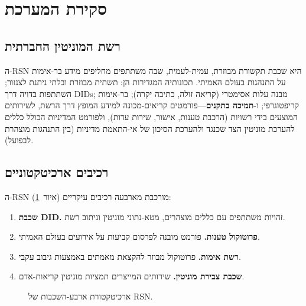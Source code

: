 \documentclass[11pt,a4paper,twocolumn]{article}
\begin{document}
\section{סקירת המערכת}

\subsection{רשת המוניטין החברתית}

ה-RSN היא שכבת תקשורת מבוזרת, עמית-לעמית, שבה משתתפים מחליפים מידע בר-אימות על התנהגות בעולם האמיתי. תכונותיה המגדירות הן: תשתית מבוזרת ובלתי ניתנת לצנזור; השתתפות בדויה דרך DIDs; מבנה עלות אסימטרי (קריאה זולה, כתיבה יקרה); בר-אימות קריפטוגרפי; ו-\textbf{תמיכה בתקנים}---פורמטים קריאים-מכונה למידע המופץ דרך הרשת, לשירותים המוצעים בידי רשויות (הרכבת טענות, אישור, שירות עדות), ולפורמט המדיניות הכולל כללים להערכת מוניטין הצד שכנגד ולהערכת הסיכון של אי-התאמת מדיניות (בין התנהגות מוצהרת לבפועל).

\subsection{רכיבים ארכיטקטוניים}

ה-RSN מורכבת מארבעה רכיבים עיקריים (איור~\ref{fig:architecture}):
\begin{enumerate}[nosep]
\item \textbf{שכבת DID.} זהויות משתתפים עם כללים מוצהרים, מטא-נתוני מוניטין וניתוב רשת.
\item \textbf{פרוטוקול טענות.} פורמט מובנה לפרסום קביעות על אירועים בעולם האמיתי.
\item \textbf{רשת אימות.} פרוטוקול מבוזר להקצאת מאמתים באמצעות גיבוב עקבי.
\item \textbf{שכבת צבירת מוניטין.} שירותים המייצרים תמציות מוניטין קריאות-אדם.
\end{enumerate}

\begin{figure}[ht]
\centering
{}
\caption{ארכיטקטורת ארבע-השכבות של RSN.}
\label{fig:architecture}
\end{figure}
\end{document}
